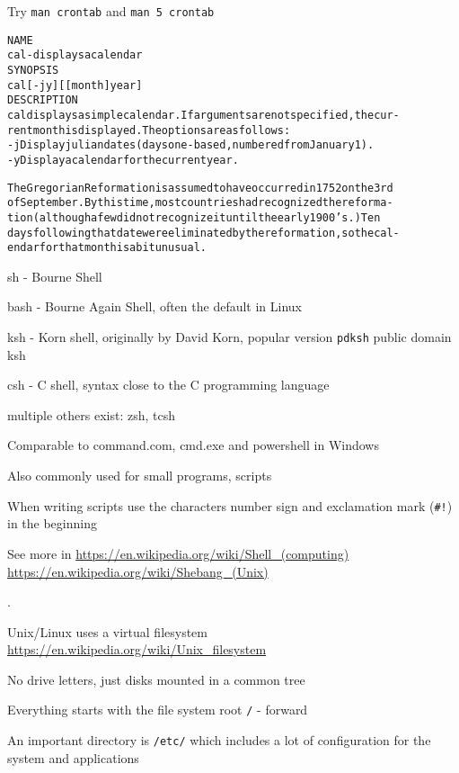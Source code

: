 \documentclass[Screen16to9,17pt]{foils}
\begin{document}
Try \verb+man crontab+ and \verb+man 5 crontab+




\begin{alltt}\footnotesize
\small
NAME
     cal - displays a calendar
SYNOPSIS
     cal [-jy] [[month]  year]
DESCRIPTION
   cal displays a simple calendar.  If arguments are not specified, the cur-
   rent month is displayed.  The options are as follows:
   -j      Display julian dates (days one-based, numbered from January 1).
   -y      Display a calendar for the current year.

The Gregorian Reformation is assumed to have occurred in 1752 on the 3rd
of September.  By this time, most countries had recognized the reforma-
tion (although a few did not recognize it until the early 1900's.)  Ten
days following that date were eliminated by the reformation, so the cal-
endar for that month is a bit unusual.
\end{alltt}



  \begin{list2}
    \item sh - Bourne Shell
\item bash - Bourne Again Shell, often the default in Linux
\item ksh - Korn shell, originally by David Korn, popular version \verb+pdksh+ public domain ksh
\item csh - C shell, syntax close to the C programming language
\item multiple others exist: zsh, tcsh
  \end{list2}
\begin{list1}
\item Comparable to command.com, cmd.exe and powershell in Windows
\item Also commonly used for small programs, scripts
\item When writing scripts use the characters number sign and exclamation mark (\verb+#!+) in the beginning
\end{list1}

See more in \url{https://en.wikipedia.org/wiki/Shell_(computing)}\\
\url{https://en.wikipedia.org/wiki/Shebang_(Unix)}


.
\begin{list2}

\item Unix/Linux uses a virtual filesystem\\
\url{https://en.wikipedia.org/wiki/Unix_filesystem}
\item No drive letters, just disks mounted in a common tree
\item Everything starts with the file system root \verb+/+ - forward
\item An important directory is \verb+/etc/+ which includes a lot of configuration for the system and applications
\end{list2}
\end{document}
